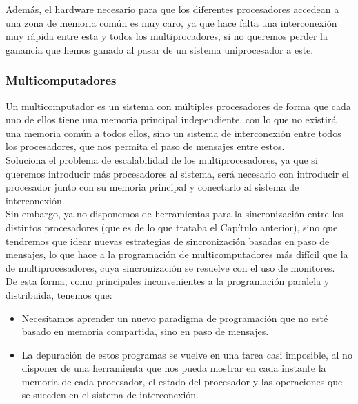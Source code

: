 Además, el hardware necesario para que los diferentes procesadores accedean a una zona de memoria común es muy caro, ya que hace falta una interconexión muy rápida entre esta y todos los multiprocadores, si no queremos perder la ganancia que hemos ganado al pasar de un sistema uniprocesador a este.

\subsubsection{Multicomputadores}
Un multicomputador es un sistema con múltiples procesadores de forma que cada uno de ellos tiene una memoria principal independiente, con lo que no existirá una memoria común a todos ellos, sino un sistema de interconexión entre todos los procesadores, que nos permita el paso de mensajes entre estos.\\

Soluciona el problema de escalabilidad de los multiprocesadores, ya que si queremos introducir más procesadores al sistema, será necesario con introducir el procesador junto con su memoria principal y conectarlo al sistema de interconexión.\\

Sin embargo, ya no disponemos de herramientas para la sincronización entre los distintos procesadores (que es de lo que trataba el Capítulo anterior), sino que tendremos que idear nuevas estrategias de sincronización basadas en paso de mensajes, lo que hace a la programación de multicomputadores más difícil que la de multiprocesadores, cuya sincronización se resuelve con el uso de monitores.\\

\noindent
De esta forma, como principales inconvenientes a la programación paralela y distribuida, tenemos que:
\begin{itemize}
    \item Necesitamos aprender un nuevo paradigma de programación que no esté basado en memoria compartida, sino en paso de mensajes.
    \item La depuración de estos programas se vuelve en una tarea casi imposible, al no disponer de una herramienta que nos pueda mostrar en cada instante la memoria de cada procesador, el estado del procesador y las operaciones que se suceden en el sistema de interconexión.
\end{itemize}

